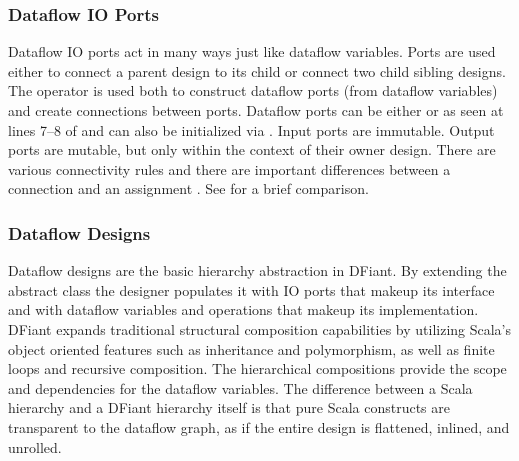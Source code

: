\subsubsection{Dataflow IO Ports} 
\label{sec:io_ports}
Dataflow IO ports act in many ways just like dataflow variables. 
Ports are used either to connect a parent design to its child or connect two child sibling designs. The operator \code{<>} is used both to construct dataflow ports (from dataflow variables) and create connections between ports. 
Dataflow ports can be either  or  as seen at lines 7--8 of  and can also be initialized via . Input ports are immutable. Output ports are mutable, but only within the context of their owner design.  
There are various connectivity rules and there are important differences between a connection \code{<>} and an assignment \code{:=}. See  for a brief comparison.

\subsubsection{Dataflow Designs} 
Dataflow designs are the basic hierarchy abstraction in DFiant. By extending the abstract class  the designer populates it with IO ports that makeup its interface and with dataflow variables and operations that makeup its implementation.
DFiant expands traditional structural composition capabilities by utilizing Scala's object oriented features such as inheritance and polymorphism, as well as finite loops and recursive composition. The hierarchical compositions provide the scope and dependencies for the dataflow variables. The difference between a Scala hierarchy and a DFiant hierarchy itself is that pure Scala constructs are transparent to the dataflow graph, as if the entire design is flattened, inlined, and unrolled. 



